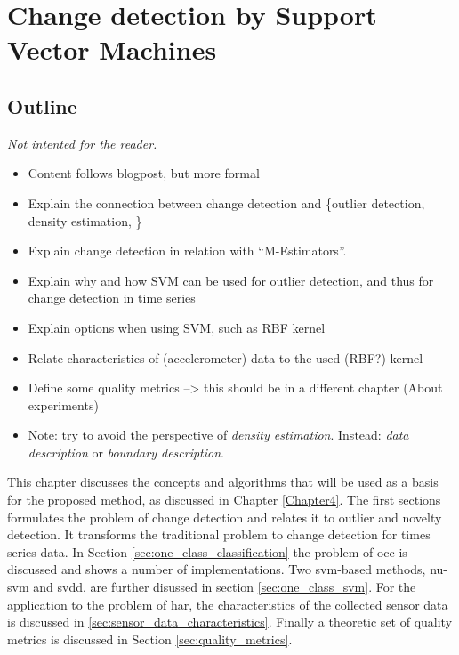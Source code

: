 
\chapter{Change detection by Support Vector Machines}

\label{Chapter3} %


\section{Outline}
\emph{Not intented for the reader.}
\begin{itemize}
  \item Content follows blogpost, but more formal
  \item Explain the connection between change detection and \{outlier detection, density estimation, \etc\}
  \item Explain change detection in relation with ``M-Estimators''.
  \item Explain why and how SVM can be used for outlier detection, and thus for change detection in time series
  \item Explain options when using SVM, such as RBF kernel
  \item Relate characteristics of (accelerometer) data to the used (RBF?) kernel
  \item Define some quality metrics --> this should be in a different chapter (About experiments)
  \item Note: try to avoid the perspective of \emph{density estimation}. Instead: \emph{data description} or \emph{boundary description}.
\end{itemize}

This chapter discusses the concepts and algorithms that will be used as a basis for the proposed method, as discussed in Chapter \ref{Chapter4}.
The first sections formulates the problem of change detection and relates it to outlier and novelty detection.
It transforms the traditional problem to change detection for times series data.
In Section \ref{sec:one_class_classification} the problem of \acrlong{occ} is discussed and shows a number of implementations.
Two \acrlong{svm}-based methods, \gls{nu-svm} and \gls{svdd}, are further disussed in section \ref{sec:one_class_svm}.
For the application to the problem of \acrlong{har}, the characteristics of the collected sensor data is discussed in \ref{sec:sensor_data_characteristics}.
Finally a theoretic set of quality metrics is discussed in Section \ref{sec:quality_metrics}.






